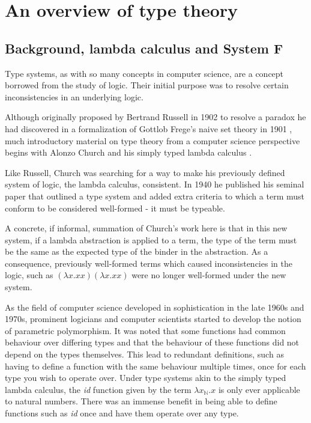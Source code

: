 \chapter{An overview of type theory}

        \section{Background, lambda calculus and System F}

          Type systems, as with so many concepts in computer science,
          are a concept borrowed from the study of logic. Their initial
          purpose was to resolve certain inconsistencies in an
          underlying logic. 
      
          Although originally proposed by Bertrand Russell in 1902 to
          resolve a paradox he had discovered in a formalization of
          Gottlob Frege's naive set theory in 1901 \cite{Russell1901}, much
          introductory material on type theory from a computer science
          perspective begins with Alonzo Church and his simply typed
          lambda calculus \cite{church1940}.
          
          Like Russell, Church was searching for a way to make his
          previously defined system of logic, the lambda calculus,
          consistent. In 1940 he published his seminal paper that outlined a
          type system and added extra criteria to which a term must
          conform to be considered well-formed - it must be typeable.
      
          A concrete, if informal, summation of Church's work here is that
          in this new system, if a lambda abstraction is applied to a term,
          the type of the term must be the same as the expected type
          of the binder in the abstraction. As a consequence,
          previously well-formed terms which caused inconsistencies in
          the logic, such as $ (\lambda x.xx)(\lambda x.xx) $ were no
          longer well-formed under the new system.
          
          As the field of computer science developed in sophistication in
          the late 1960s and 1970s, prominent logicians and computer
          scientists started to develop the notion of parametric
          polymorphism. It was noted that some functions had common
          behaviour over differing types and that the behaviour of these
          functions did not depend on the types themselves. This lead to
          redundant definitions, such as having to define a function with the
          same behaviour multiple times, once for each type you wish to
          operate over. Under type systems akin to the simply typed lambda
          calculus, the \emph{id} function given by the term $\lambda
          x_{\mathbb{N}}.x $ is only ever applicable to natural
          numbers. There was an immense benefit in being able to define 
          functions such as \emph{id} once and have them operate over any type.
      
